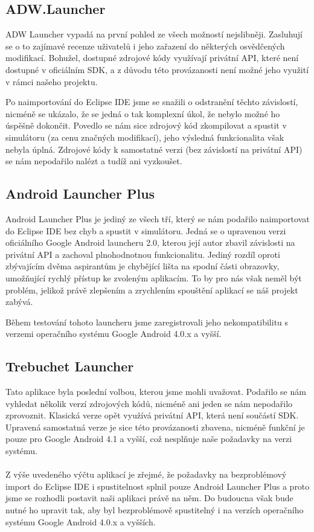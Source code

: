\documentclass[thesis=M,czech]{FITthesis}[2012/06/26]
\begin{document}
\subsection{ADW.Launcher}
ADW Launcher vypadá na první pohled ze všech možností nejslibněji. Zasluhují se o to zajímavé recenze uživatelů i jeho zařazení do některých osvědčených modifikací. Bohužel, dostupné zdrojové kódy využívají privátní API, které není dostupné v oficiálním SDK, a z důvodu této provázanosti není možné jeho využití v rámci našeho projektu.

Po naimportování do Eclipse IDE jsme se snažili o odstranění těchto závislostí, nicméně se ukázalo, že se jedná o tak komplexní úkol, že nebylo možné ho úspěšně dokončit. Povedlo se nám sice zdrojový kód zkompilovat a spustit v simulátoru (za cenu značných modifikací), jeho výsledná funkcionalita však nebyla úplná. Zdrojové kódy k samostatné verzi (bez závislostí na privátní API) se nám nepodařilo nalézt a tudíž ani vyzkoušet.

\subsection{Android Launcher Plus}
Android Launcher Plus je jediný ze všech tří, který se nám podařilo naimportovat do Eclipse IDE bez chyb a spustit v simulátoru. Jedná se o upravenou verzi oficiálního Google Android launcheru 2.0, kterou její autor zbavil závislosti na privátní API a zachoval plnohodnotnou funkcionalitu. Jediný rozdíl oproti zbývajícím dvěma aspirantům je chybějící lišta na spodní části obrazovky, umožňující rychlý přístup ke zvoleným aplikacím. To by pro nás však neměl být problém, jelikož právě zlepšením a zrychlením spouštění aplikací se náš projekt zabývá.

Během testování tohoto launcheru jsme zaregistrovali jeho nekompatibilitu s verzemi operačního systému Google Android 4.0.x a vyšší.

\subsection{Trebuchet Launcher}
Tato aplikace byla poslední volbou, kterou jsme mohli uvažovat. Podařilo se nám vyhledat několik verzí zdrojových kódů, nicméně ani jeden se nám nepodařilo zprovoznit. Klasická verze opět využívá privátní API, která není součástí SDK. Upravená samostatná verze je sice této provázanosti zbavena, nicméně funkční je pouze pro Google Android 4.1 a vyšší, což nesplňuje naše požadavky na verzi systému.
\\\\
Z výše uvedeného výčtu aplikací je zřejmé, že požadavky na bezproblémový import do Eclipse IDE i spustitelnost splnil pouze Android Launcher Plus a proto jsme se rozhodli postavit naši aplikaci právě na něm. Do budoucna však bude nutné ho upravit tak, aby byl bezproblémově spustitelný i na verzích operačního systému Google Android 4.0.x a vyšších.
\end{document}
